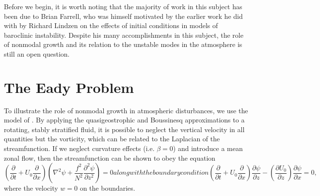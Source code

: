 \documentclass[letterpaper,11pt,onecolumn,twoside,titlepage]{article}
\newcommand{\pdiff}[2]{\frac{\partial #1}{\partial #2}}
\begin{document}
Before we begin, it is worth noting that the majority of work in this subject has been due to Brian Farrell, who was himself motivated by the earlier work he did with by Richard Lindzen on the effects of initial conditions in models of baroclinic instability. Despite his many accomplishments in this subject, the role of nonmodal growth and its relation to the unstable modes in the atmosphere is still an open question.


\section{The Eady Problem}

To illustrate the role of nonmodal growth in atmospheric disturbances, we use the model of \cite{Eady:1949}. By applying the quasigeostrophic and Boussinesq approximations to a rotating, stably stratified fluid, it is possible to neglect the vertical velocity in all quantities but the vorticity, which can be related to the Laplacian of the streamfunction. If we neglect curvature effects (i.e. $\beta = 0$) and introduce a mean zonal flow, then the streamfunction can be shown to obey the equation
\begin{subequations}\label{fulleady}
\begin{equation}\label{fulleady1}
\left(\pdiff{}{t} + U_0 \pdiff{}{x}\right)\left(\nabla^2 \psi + \frac{f^2}{N^2} \pdiff{^2 \psi}{z^2} \right) = 0
\end{equation}
along with the boundary condition
\begin{equation}\label{fulleady2}
\left(\pdiff{}{t} + U_0 \pdiff{}{x}\right)\pdiff{\psi}{z} - \left(\pdiff{U_0}{z}\right) \pdiff{\psi}{x} = 0,
\end{equation}
\end{subequations}
where the velocity $w=0$ on the boundaries.
\end{document}
